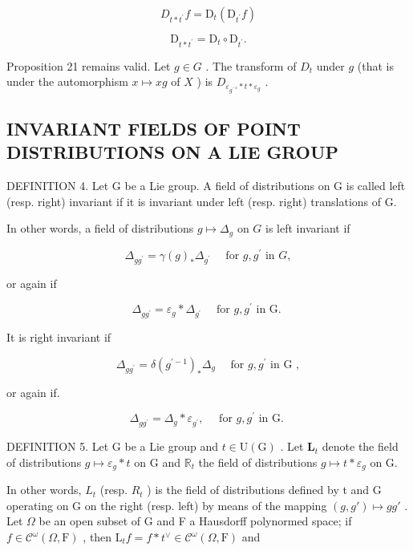 \[
D _ {t * t ^ {\prime}} f = \mathrm{D} _ {t} (\mathrm{D} _ {t ^ {\prime}} f)\tag{20}
\]

\[
\mathrm{D} _ {t * t ^ {\prime}} = \mathrm{D} _ {t} \circ \mathrm{D} _ {t ^ {\prime}}\tag{21}.
\]

Proposition 21 remains valid. Let \(g \in G\) . The transform of \(D_t\) under \(g\) (that is under the automorphism \(x \mapsto xg\) of \(X\) ) is \(D_{\varepsilon_{g^{-1}} * t * \varepsilon_g}\) .

\subsection{INVARIANT FIELDS OF POINT DISTRIBUTIONS ON A LIE GROUP}

DEFINITION 4. Let G be a Lie group. A field of distributions on G is called left (resp. right) invariant if it is invariant under left (resp. right) translations of G.

In other words, a field of distributions \(g \mapsto \Delta_g\) on \(G\) is left invariant if

\[
\Delta_ {g g ^ {\prime}} = \gamma (g) _ {*} \Delta_ {g ^ {\prime}} \quad \text { for } g, g ^ {\prime} \text { in } G,
\]

or again if

\[
\Delta_ {g g ^ {\prime}} = \varepsilon_ {g} * \Delta_ {g ^ {\prime}} \quad \text { for   } g, g ^ {\prime} \text {   in   G. }
\]

It is right invariant if

\[
\Delta_ {g g ^ {\prime}} = \delta (g ^ {\prime - 1}) _ {*} \Delta_ {g} \quad \text { for   } g, g ^ {\prime} \text {   in   G },
\]

or again if.

\[
\Delta_ {g g ^ {\prime}} = \Delta_ {g} * \varepsilon_ {g ^ {\prime}}, \quad \text { for   } g, g ^ {\prime} \text {   in   G. }
\]

DEFINITION 5. Let G be a Lie group and \(t \in \mathrm{U}(\mathrm{G})\) . Let \(\mathbf{L}_t\) denote the field of distributions \(g \mapsto \varepsilon_g * t\) on G and \(\mathbb{R}_t\) the field of distributions \(g \mapsto t * \varepsilon_g\) on G.

In other words, \(L_{t}\) (resp. \(R_{t}\) ) is the field of distributions defined by t and G operating on G on the right (resp. left) by means of the mapping \((g, g') \mapsto gg'\) . Let \(\Omega\) be an open subset of G and F a Hausdorff polynormed space; if \(f \in \mathcal{C}^{\omega}(\Omega, \mathrm{F})\) , then \(\mathrm{L}_{t}f = f * t^{\vee} \in \mathcal{C}^{\omega}(\Omega, \mathrm{F})\) and

